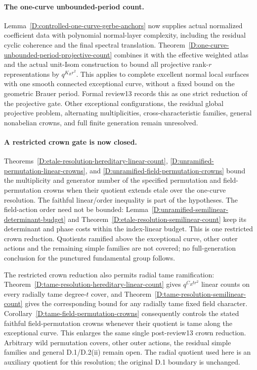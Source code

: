 \paragraph{The one-curve unbounded-period count.}
Lemma~\ref{D:controlled-one-curve-gerbe-anchors} now supplies
actual normalized coefficient data with polynomial normal-layer
complexity, including the residual cyclic coherence and the final
spectral translation. Theorem~\ref{D:one-curve-unbounded-period-projective-count}
combines it with the effective weighted atlas and the actual unit-Isom
construction to bound all projective rank-$r$ representations by
$q^{K_Rr^2}$. This applies to complete excellent normal local surfaces
with one smooth connected exceptional curve, without a fixed bound on
the geometric Brauer period. Formal review13 records this as one
strict reduction of the projective gate. Other exceptional
configurations, the residual global projective problem, alternating
multiplicities, cross-characteristic families, general nonabelian
crowns, and full finite generation remain unresolved.


\paragraph{A restricted crown gate is now closed.}
Theorems~\ref{D:etale-resolution-hereditary-linear-count},
\ref{D:unramified-permutation-linear-crowns}, and
\ref{D:unramified-field-permutation-crowns} bound the
multiplicity and generator number of the specified
permutation and field-permutation crowns when their
quotient extends etale over the one-curve resolution.
The faithful linear/order inequality is part of the
hypotheses. The field-action order need not be bounded:
Lemma~\ref{D:unramified-semilinear-determinant-budget}
and Theorem~\ref{D:etale-resolution-semilinear-count}
keep its determinant and phase costs within the
index-linear budget. This is one restricted crown
reduction. Quotients ramified above the exceptional
curve, other outer actions and the remaining simple
families are not covered; no full-generation conclusion
for the punctured fundamental group follows.


The restricted crown reduction also permits radial tame ramification:
Theorem~\ref{D:tame-resolution-hereditary-linear-count} gives
$q^{C_Rtr^2}$ linear counts on every radially tame degree-$t$ cover,
and Theorem~\ref{D:tame-resolution-semilinear-count} gives the
corresponding bound for any radially tame fixed field character.
Corollary~\ref{D:tame-field-permutation-crowns} consequently controls
the stated faithful field-permutation crowns whenever their quotient
is tame along the exceptional curve. This enlarges the same single
post-review13 crown reduction. Arbitrary wild permutation covers,
other outer actions, the residual simple families and general
D.1/D.2(ii) remain open. The radial quotient used here is an auxiliary
quotient for this resolution; the original D.1 boundary is unchanged.


